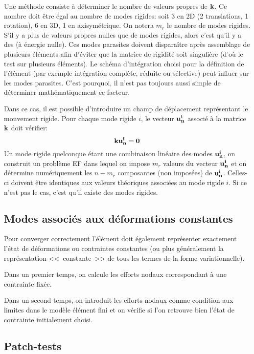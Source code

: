 \medskip
Une méthode consiste à déterminer le nombre de valeurs propres  de $\mathbf{k}$.
Ce nombre doit être égal au nombre de modes rigides: soit 3 en 2D (2 translations, 1 rotation),
6 en 3D, 1 en axisymétrique. On notera $m_r$ le nombre de modes rigides.
S'il y a plus de valeurs propres nulles que de modes rigides, alors c'est qu'il y a des
 (à énergie nulle).
Ces modes parasites doivent disparaître après assemblage de plusieurs éléments
afin d'éviter que la matrice de rigidité soit singulière (d'où le test sur plusieurs éléments).
Le schéma d'intégration choisi pour la définition de l'élément (par exemple intégration
complète, réduite ou sélective) peut influer sur les modes parasites.
C'est pourquoi, il n'est pas toujours aussi simple de déterminer mathématiquement
ce facteur.

\medskip
Dans ce cas, il est possible d'introduire un champ de déplacement représentant le
mouvement rigide.
Pour chaque mode rigide $i$, le vecteur $\mathbf{u^i_n}$ associé à la matrice $\mathbf{k}$ doit
vérifier:
\begin{equation}\mathbf{k}\mathbf{u^i_n}=\mathbf{0}\end{equation}
Un mode rigide quelconque étant une combinaison linéaire des modes $\mathbf{u^i_n}$,
on construit un problème EF dans lequel on impose $m_r$ valeurs du vecteur $\mathbf{u^i_n}$
et on détermine numériquement les $n-m_r$ composantes (non imposées) de $\mathbf{u^i_n}$.
Celles-ci doivent être identiques aux valeurs théoriques associées au mode
rigide $i$. Si ce n'est pas le cas, c'est qu'il existe des modes rigides.
\medskip
\subsection{Modes associés aux déformations constantes}
Pour converger correctement l'élément doit également représenter
exactement l'état de déformations ou contraintes constantes (ou plus
généralement la représentation <<~constante~>> de tous les termes de la
forme variationnelle).

Dans un premier temps, on calcule les efforts nodaux correspondant à une contrainte fixée.

Dans un second temps, on introduit les efforts nodaux comme condition aux limites dans le modèle
élément fini et on vérifie si l'on retrouve bien l'état de contrainte initialement choisi.

\medskip
\subsection{Patch-tests}

